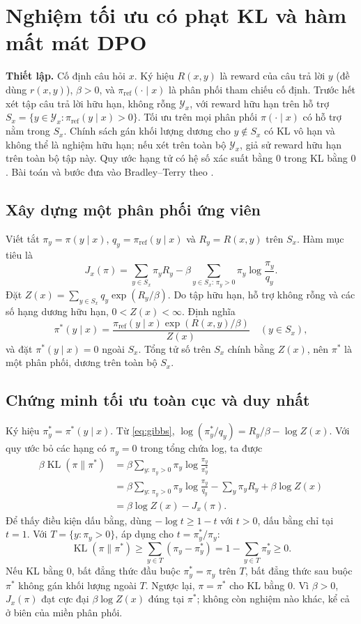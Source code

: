 \documentclass[11pt,a4paper]{article}
\DeclareMathOperator{\KL}{KL}
\newcommand{\pref}{\pi_{\mathrm{ref}}}
\begin{document}
\section{Nghiệm tối ưu có phạt KL và hàm mất mát DPO}
\label{sec:dpo}
\textbf{Thiết lập.} Cố định câu hỏi $x$. Ký hiệu $R(x,y)$ là reward của câu trả lời $y$ (đề dùng $r(x,y)$), $\beta>0$, và $\pref(\cdot\mid x)$ là phân phối tham chiếu cố định. Trước hết xét tập câu trả lời hữu hạn, không rỗng $\mathcal Y_x$, với reward hữu hạn trên hỗ trợ $S_x=\{y\in\mathcal Y_x:\pref(y\mid x)>0\}$. Tối ưu trên mọi phân phối $\pi(\cdot\mid x)$ có hỗ trợ nằm trong $S_x$. Chính sách gán khối lượng dương cho $y\notin S_x$ có KL vô hạn và không thể là nghiệm hữu hạn; nếu xét trên toàn bộ $\mathcal Y_x$, giả sử reward hữu hạn trên toàn bộ tập này. Quy ước hạng tử có hệ số xác suất bằng $0$ trong KL bằng $0$. Bài toán và bước đưa vào Bradley–Terry theo \cite[§3–4, phương trình (1)–(7), Phụ lục A.1–A.2]{dpo}.

\subsection*{Xây dựng một phân phối ứng viên}
Viết tắt $\pi_y=\pi(y\mid x)$, $q_y=\pref(y\mid x)$ và $R_y=R(x,y)$ trên $S_x$. Hàm mục tiêu là
\[
  J_x(\pi)=\sum_{y\in S_x}\pi_y R_y
    -\beta\sum_{y\in S_x:\,\pi_y>0}\pi_y\log\frac{\pi_y}{q_y}.
\]
Đặt $Z(x)=\sum_{y\in S_x}q_y\exp(R_y/\beta)$. Do tập hữu hạn, hỗ trợ không rỗng và các số hạng dương hữu hạn, $0<Z(x)<\infty$. Định nghĩa
\begin{equation}
  \pi^*(y\mid x)=\frac{\pref(y\mid x)\exp(R(x,y)/\beta)}{Z(x)}
  \quad (y\in S_x),
  \label{eq:gibbs}
\end{equation}
và đặt $\pi^*(y\mid x)=0$ ngoài $S_x$. Tổng tử số trên $S_x$ chính bằng $Z(x)$, nên $\pi^*$ là một phân phối, dương trên toàn bộ $S_x$.

\subsection*{Chứng minh tối ưu toàn cục và duy nhất}
Ký hiệu $\pi_y^*=\pi^*(y\mid x)$. Từ \eqref{eq:gibbs}, $\log(\pi_y^*/q_y)=R_y/\beta-\log Z(x)$. Với quy ước bỏ các hạng có $\pi_y=0$ trong tổng chứa log, ta được
\begin{align*}
  \beta\KL(\pi\|\pi^*)
     &=\beta\sum_{y:\,\pi_y>0}\pi_y\log\frac{\pi_y}{\pi_y^*}\\
     &=\beta\sum_{y:\,\pi_y>0}\pi_y\log\frac{\pi_y}{q_y}
       -\sum_y\pi_y R_y+\beta\log Z(x)\\
     &=\beta\log Z(x)-J_x(\pi).
\end{align*}
Để thấy điều kiện dấu bằng, dùng $-\log t\ge 1-t$ với $t>0$, dấu bằng chỉ tại $t=1$. Với $T=\{y:\pi_y>0\}$, áp dụng cho $t=\pi_y^*/\pi_y$:
\[
  \KL(\pi\|\pi^*)\ge\sum_{y\in T}(\pi_y-\pi_y^*)
       =1-\sum_{y\in T}\pi_y^*\ge0.
\]
Nếu KL bằng $0$, bất đẳng thức đầu buộc $\pi_y^*=\pi_y$ trên $T$, bất đẳng thức sau buộc $\pi^*$ không gán khối lượng ngoài $T$. Ngược lại, $\pi=\pi^*$ cho KL bằng $0$. Vì $\beta>0$, $J_x(\pi)$ đạt cực đại $\beta\log Z(x)$ đúng tại $\pi^*$; không còn nghiệm nào khác, kể cả ở biên của miền phân phối.
\end{document}
